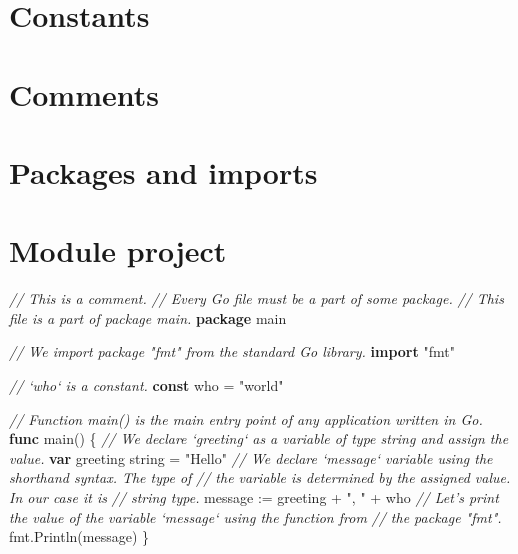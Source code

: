 \documentclass[]{book}
\newenvironment{Shaded}{\begin{snugshade}}{\end{snugshade}}
\newcommand{\CommentTok}[1]{\textcolor[rgb]{0.56,0.35,0.01}{\textit{#1}}}
\newcommand{\DataTypeTok}[1]{\textcolor[rgb]{0.13,0.29,0.53}{#1}}
\newcommand{\KeywordTok}[1]{\textcolor[rgb]{0.13,0.29,0.53}{\textbf{#1}}}
\newcommand{\NormalTok}[1]{#1}
\newcommand{\StringTok}[1]{\textcolor[rgb]{0.31,0.60,0.02}{#1}}
\begin{document}
\hypertarget{constants}{%
\section{Constants}\label{constants}}

\hypertarget{comments}{%
\section{Comments}\label{comments}}

\hypertarget{packages-and-imports}{%
\section{Packages and imports}\label{packages-and-imports}}

\hypertarget{module-project}{%
\section*{Module project}\label{module-project}}

\begin{Shaded}
\begin{Highlighting}[]
\CommentTok{// This is a comment.}
\CommentTok{// Every Go file must be a part of some package.}
\CommentTok{// This file is a part of package main.}
\KeywordTok{package}\NormalTok{ main}

\CommentTok{// We import package "fmt" from the standard Go library.}
\KeywordTok{import} \StringTok{"fmt"}

\CommentTok{// `who` is a constant.}
\KeywordTok{const}\NormalTok{ who = }\StringTok{"world"}

\CommentTok{// Function main() is the main entry point of any application written in Go.}
\KeywordTok{func}\NormalTok{ main() \{}
    \CommentTok{// We declare `greeting` as a variable of type string and assign the value.}
    \KeywordTok{var}\NormalTok{ greeting }\DataTypeTok{string}\NormalTok{ = }\StringTok{"Hello"}
    \CommentTok{// We declare `message` variable using the shorthand syntax. The type of}
    \CommentTok{// the variable is determined by the assigned value. In our case it is}
    \CommentTok{// string type.}
\NormalTok{    message := greeting + }\StringTok{", "}\NormalTok{ + who}
    \CommentTok{// Let's print the value of the variable `message` using the function from}
    \CommentTok{// the package "fmt".}
\NormalTok{    fmt.Println(message)}
\NormalTok{\}}
\end{Highlighting}
\end{Shaded}
\end{document}
